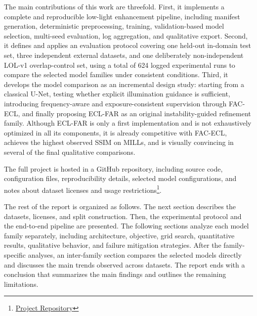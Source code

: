 The main contributions of this work are threefold. First, it implements a complete and reproducible low-light enhancement pipeline, including manifest generation, deterministic preprocessing, training, validation-based model selection, multi-seed evaluation, log aggregation, and qualitative export. Second, it defines and applies an evaluation protocol covering one held-out in-domain test set, three independent external datasets, and one deliberately non-independent LOL-v1 overlap-control set, using a total of 624 logged experimental runs to compare the selected model families under consistent conditions. Third, it develops the model comparison as an incremental design study: starting from a classical U-Net, testing whether explicit illumination guidance is sufficient, introducing frequency-aware and exposure-consistent supervision through FAC-ECL, and finally proposing ECL-FAR as an original instability-guided refinement family. Although ECL-FAR is only a first implementation and is not exhaustively optimized in all its components, it is already competitive with FAC-ECL, achieves the highest observed SSIM on MILLs, and is visually convincing in several of the final qualitative comparisons.

The full project is hosted in a GitHub repository, including source code, configuration files, reproducibility details, selected model configurations, and notes about dataset licenses and usage restrictions\footnote{\href{https://github.com/cosimo-curri/low-light-enhancement-cross-dataset}{Project Repository}}.

The rest of the report is organized as follows. The next section describes the datasets, licenses, and split construction. Then, the experimental protocol and the end-to-end pipeline are presented. The following sections analyze each model family separately, including architecture, objective, grid search, quantitative results, qualitative behavior, and failure mitigation strategies. After the family-specific analyses, an inter-family section compares the selected models directly and discusses the main trends observed across datasets. The report ends with a conclusion that summarizes the main findings and outlines the remaining limitations.